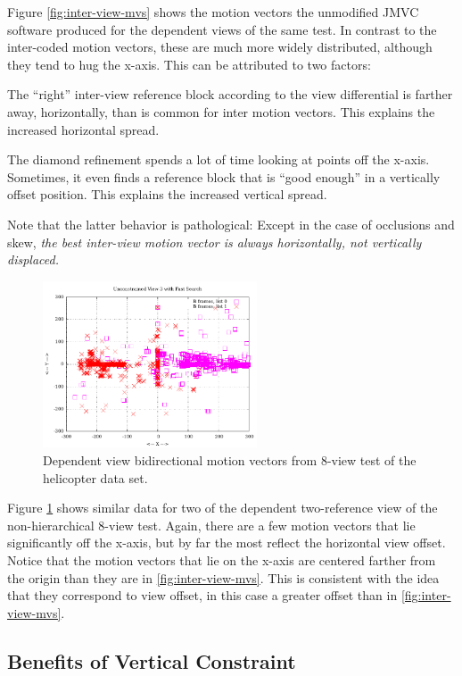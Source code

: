 \documentclass{sig-alternate-05-2015}
\begin{document}
Figure \ref{fig:inter-view-mvs} shows the motion vectors the unmodified JMVC
software produced for the dependent views of the same test. In contrast to the
inter-coded motion vectors, these are much more widely distributed, although
they tend to hug the x-axis. This can be attributed to two factors:
\begin{compactenum}
\item The ``right'' inter-view reference block according to the view
differential is farther away, horizontally, than is common for inter motion
vectors. This explains the increased horizontal spread.
\item The diamond refinement spends a lot of time looking at points off
the x-axis. Sometimes, it even finds a reference block that is ``good enough''
in a vertically offset position. This explains the increased vertical spread.
\end{compactenum} Note that the latter behavior is pathological: Except in the
case of occlusions and skew, {\it the best inter-view motion vector is always
horizontally, not vertically displaced.}

\begin{figure}[h]
\centering
\includegraphics[width=2.5in]{figures/helicopter-inter-view-bimvs1.pdf}
\caption{
Dependent view bidirectional motion vectors from 8-view test of the
helicopter data set.
}
\label{fig:inter-view-bimvs1}
\end{figure}

Figure \ref{fig:inter-view-bimvs1} shows similar data for two of the dependent
two-reference view of the non-hierarchical 8-view test. Again, there are a few
motion vectors that lie significantly off the x-axis, but by far the most
reflect the horizontal view offset. Notice that the motion vectors that lie on
the x-axis are centered farther from the origin than they are in
\ref{fig:inter-view-mvs}. This is consistent with the idea that they correspond
to view offset, in this case a greater offset than in \ref{fig:inter-view-mvs}.

\subsection{Benefits of Vertical Constraint}
\label{subsec:constrained}
\end{document}
